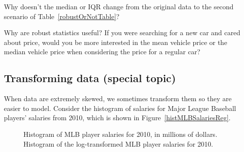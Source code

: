 \begin{exercise}
Why doesn't the median or IQR change from the original  data to the second scenario of Table~\ref{robustOrNotTable}?
\end{exercise}


\begin{exercise}
Why are robust statistics useful? If you were searching for a new car and cared about price, would you be more interested in the mean vehicle price or the median vehicle price when considering the price for a regular car?
\end{exercise}

\subsection{Transforming data (special topic)}

When data are extremely skewed, we sometimes transform them so they are easier to model. Consider the histogram of salaries for Major League Baseball players' salaries from 2010, which is shown in Figure~\ref{histMLBSalariesReg}. %
\begin{figure}[ht]
\centering
{}
\caption{ Histogram of MLB player salaries for 2010, in millions of dollars.  Histogram of the log-transformed MLB player salaries for 2010.}
\label{histMLBSalaries}
\end{figure}


